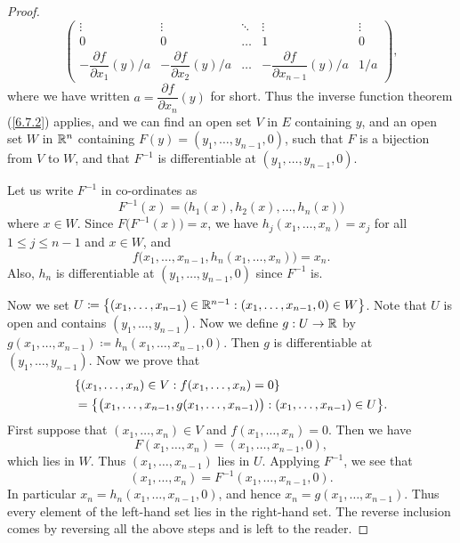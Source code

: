 \begin{proof}
\[\begin{pmatrix}
      \vdots                                   & \vdots                                   & \ddots & \vdots                                         & \vdots \\
      0                                        & 0                                        & \dots  & 1                                              & 0      \\
      -\dfrac{\partial f}{\partial x_1}(y) / a & -\dfrac{\partial f}{\partial x_2}(y) / a & \dots  & -\dfrac{\partial f}{\partial x_{n - 1}}(y) / a & 1 / a
    \end{pmatrix},
  \]
  where we have written \(a = \dfrac{\partial f}{\partial x_n}(y)\) for short.
  Thus the inverse function theorem (\cref{6.7.2}) applies, and we can find an open set \(V\) in \(E\) containing \(y\), and an open set \(W\) in \(\mathbb{R}^n\) containing \(F(y) = (y_1, \dots, y_{n - 1}, 0)\), such that \(F\) is a bijection from \(V\) to \(W\), and that \(F^{-1}\) is differentiable at \((y_1, \dots, y_{n - 1}, 0)\).

  Let us write \(F^{-1}\) in co-ordinates as
  \[
    F^{-1}(x) = \big(h_1(x), h_2(x), \dots, h_n(x)\big)
  \]
  where \(x \in W\).
  Since \(F\big(F^{-1}(x)\big) = x\), we have \(h_j(x_1, \dots, x_n) = x_j\) for all \(1 \leq j \leq n - 1\) and \(x \in W\), and
  \[
    f\big(x_1, \dots, x_{n - 1}, h_n(x_1, \dots, x_n)\big) = x_n.
  \]
  Also, \(h_n\) is differentiable at \((y_1, \dots, y_{n - 1}, 0)\) since \(F^{-1}\) is.

  Now we set \(U \coloneqq \left\lbrace(x_1, \dots, x_{n - 1}) \in \mathbb{R}^{n - 1} : (x_1, \dots, x_{n - 1}, 0) \in W\right\rbrace\).
  Note that \(U\) is open and contains \((y_1, \dots, y_{n - 1})\).
  Now we define \(g : U \to \mathbb{R}\) by \(g(x_1, \dots, x_{n - 1}) \coloneqq h_n(x_1, \dots, x_{n - 1}, 0)\).
  Then \(g\) is differentiable at \((y_1, \dots, y_{n - 1})\).
  Now we prove that
  \begin{align*}
     & \set{(x_1, \dots, x_n) \in V : f(x_1, \dots, x_n) = 0}                                             \\
     & = \set{\big(x_1, \dots, x_{n - 1}, g(x_1, \dots, x_{n - 1})\big) : (x_1, \dots, x_{n - 1}) \in U}.
  \end{align*}
  First suppose that \((x_1, \dots, x_n) \in V\) and \(f(x_1, \dots, x_n) = 0\).
  Then we have
  \[
    F(x_1, \dots, x_n) = (x_1, \dots, x_{n - 1}, 0),
  \]
  which lies in \(W\).
  Thus \((x_1, \dots, x_{n - 1})\) lies in \(U\).
  Applying \(F^{-1}\), we see that
  \[
    (x_1, \dots, x_n) = F^{-1}(x_1, \dots, x_{n - 1}, 0).
  \]
  In particular \(x_n = h_n(x_1, \dots, x_{n - 1}, 0)\), and hence \(x_n = g(x_1, \dots, x_{n - 1})\).
  Thus every element of the left-hand set lies in the right-hand set.
  The reverse inclusion comes by reversing all the above steps and is left to the reader.


\end{proof}
